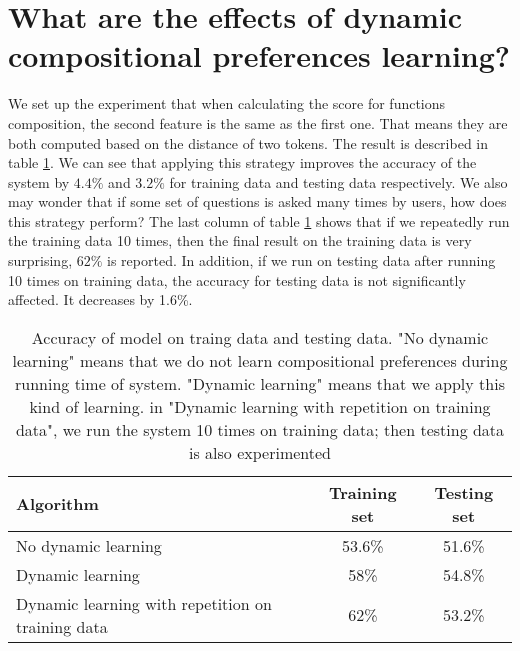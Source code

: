 \section{What are the effects of dynamic compositional preferences learning?}
We set up the experiment that when calculating the score for functions composition, the second feature is the same as the first one. That means they are both computed based on the distance of two tokens. The result is described in table \ref{d-c-p-eff}. We can see that applying this strategy improves the accuracy of the system by $4.4\%$ and $3.2\%$ for training data and testing data respectively. We also may wonder that if some set of questions is asked many times by users, how does this strategy perform? The last column of table \ref{d-c-p-eff} shows that if we repeatedly run the training data 10 times, then the final result on the training data is very surprising, $62\%$ is reported. In addition, if we run on testing data after running 10 times on training data, the accuracy for testing data is not significantly affected. It decreases by 1.6\%. 
\begin{table}[h] 
	\begin{center}
	    \begin{tabular}{| p{5cm} | c | c |}
	    \hline
	    Algorithm & Training set & Testing set \\ \hline
		No dynamic learning & 53.6\% & 51.6\%  \\ \hline
	    Dynamic learning & 58\% & 54.8\%  \\ \hline
	    Dynamic learning with repetition on training data & 62\% & 53.2\%  \\
	    \hline
	    \end{tabular}        
	\end{center}
	\scriptsize
	\caption{Accuracy of model on traing data and testing data. "No dynamic learning" means that we do not learn compositional preferences during running time of system. "Dynamic learning" means that we apply this kind of learning. in "Dynamic learning with repetition on training data", we run the system 10 times on training data; then testing data is also experimented}
    \label{d-c-p-eff}
\end{table}